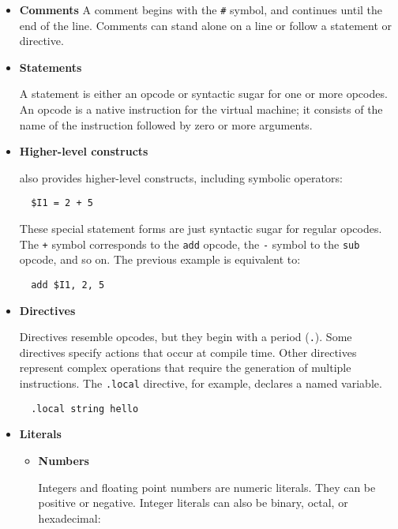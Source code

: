 \begin{itemize}
\item {\bf Comments }
A comment begins with the \verb|#| symbol, and continues until the end of
the line. Comments can stand alone on a line or follow a statement
or directive.

\item {\bf Statements }

A statement is either an opcode or syntactic sugar for one or more
opcodes. An opcode is a native instruction for the virtual machine;
it consists of the name of the instruction followed by zero or more
arguments.

\item {\bf Higher-level constructs }

 also provides higher-level constructs, including symbolic operators:

\begin{verbatim}
  $I1 = 2 + 5
\end{verbatim}

These special statement forms are just syntactic sugar for regular
opcodes. The \verb|+| symbol corresponds to the \verb|add| opcode, the 
\verb|-| symbol
to the \verb|sub| opcode, and so on. The previous example is equivalent
to:

\begin{verbatim}
  add $I1, 2, 5
\end{verbatim}

\item {\bf Directives }

Directives resemble opcodes, but they begin with a period (\verb|.|). Some
directives specify actions that occur at compile time. Other
directives represent complex operations that require the generation
of multiple instructions. The \verb|.local| directive, for example, declares
a named variable.

\begin{verbatim}
  .local string hello
\end{verbatim}

\item {\bf Literals }

\begin{itemize}
\item {\bf Numbers }

Integers and floating point numbers are numeric literals. They can be positive or negative.
Integer literals can also be binary, octal, or hexadecimal:


\end{itemize}
\end{itemize}
